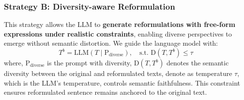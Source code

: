 \subsubsection{Strategy B: Diversity-aware Reformulation}

\hfill \break
This strategy allows the LLM to \textbf{generate reformulations with free-form expressions under realistic constraints}, enabling diverse perspectives to emerge without semantic distortion. We guide the language model with:
\begin{equation}
T^b = \text{LLM}(T \mid \text{P}_{\text{diverse}}), \quad \text{s.t. } \text{D}(T, T^b) \leq \tau
\end{equation}
where, $\text{P}_{\text{diverse}}$ is the prompt with diversity, \(\text{D}(T, T^b)\) denotes the semantic diversity between the original and reformulated texts, denote as temperature \(\tau\), which is the LLM's temperature, controls semantic faithfulness. This constraint ensures reformulated sentence remains anchored to the original text.




